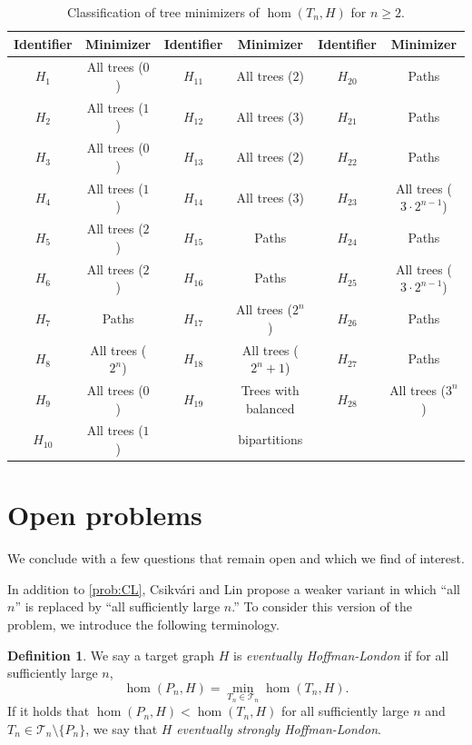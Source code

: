 \documentclass[11pt]{article}
\theoremstyle{definition}
\newtheorem{definition}[theorem]{Definition}
\begin{document}
\begin{table}[ht!]
\begin{center}
\begin{tabular}{|c|c||c|c||c|c|}
\hline
Identifier & Minimizer & Identifier & Minimizer& Identifier & Minimizer\\
\hline
$H_1$ & All trees ($0$) & $H_{11}$ & All trees ($2$) & $H_{20}$ & Paths \\
$H_2$ & All trees ($1$) & $H_{12}$ & All trees ($3$) & $H_{21}$ & Paths \\
$H_3$ & All trees ($0$) & $H_{13}$ & All trees ($2$) & $H_{22}$ & Paths\\
$H_4$ & All trees ($1$) & $H_{14}$ & All trees ($3$) & $H_{23}$ & All trees ($3\cdot2^{n-1}$)\\
$H_5$ & All trees ($2$) & $H_{15}$ & Paths & $H_{24}$ & Paths\\
$H_6$ & All trees ($2$) & $H_{16}$ & Paths & $H_{25}$ & All trees ($3\cdot2^{n-1}$)\\
$H_7$ & Paths & $H_{17}$ & All trees ($2^n$) & $H_{26}$ & Paths \\
$H_8$ & All trees ($2^n$) & $H_{18}$ & All trees ($2^n + 1$) & $H_{27}$ & Paths\\
$H_9$ & All trees ($0$) & $H_{19}$ & Trees with balanced & $H_{28}$&All trees ($3^n$)\\
$H_{10}$ & All trees ($1$) &  &  bipartitions  &&\\
\hline
\end{tabular}
\caption{Classification of tree minimizers of $\hom(T_n,H)$ for $n \ge 2$.}
\label{tab:28}
\end{center}
\end{table}

\section{Open problems} \label{sec:open_problems}

We conclude with a few questions that remain open and which we find of interest.

In addition to \cref{prob:CL}, Csikv\'{a}ri and Lin propose a weaker variant in which ``all $n$'' is replaced by ``all sufficiently large $n$.'' To consider this version of the problem, we introduce the following terminology.

\begin{definition}
We say a target graph $H$ is \emph{eventually Hoffman-London} if for all sufficiently large $n$,
\[ \hom(P_n,H) = \min_{T_n \in \mathcal{T}_n} \hom(T_n,H). \]
If it holds that $\hom(P_n,H) < \hom(T_n,H)$ for all sufficiently large $n$ and $T_n \in \mathcal{T}_n\setminus \{P_n\}$, we say that $H$ \emph{eventually strongly Hoffman-London}. 
\end{definition}
\end{document}
